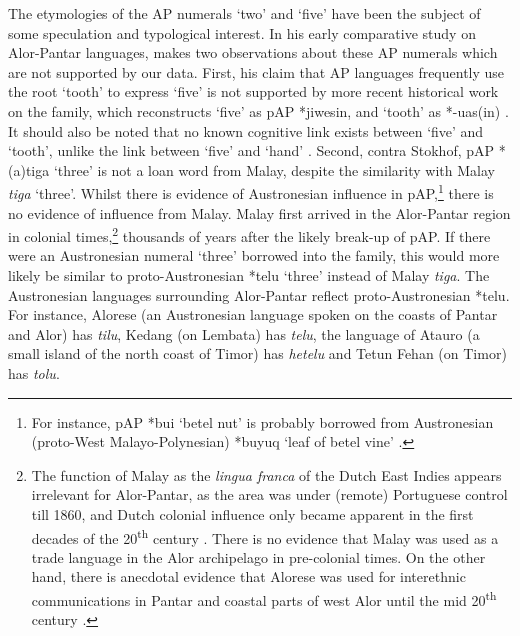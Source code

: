The etymologies of the AP numerals `two' and `five' have been the subject of some speculation and typological interest. In his early comparative study on Alor-Pantar languages, \citet[21]{Stokhof1975} makes two observations about these AP numerals which are not supported by our data. First, his claim that AP languages frequently use the root `tooth' to express `five' is not supported by more recent historical work on the family, which reconstructs `five' as pAP *jiwesin, and `tooth' as *-uas(in) \citep{HoltonRobinsonTV}. It should also be noted that no known cognitive link exists between `five' and `tooth', unlike the link between `five' and `hand' \citep{Majewicz1981,Majewicz1984,Heine1997}. Second, contra Stokhof, pAP *(a)tiga `three' is not a loan word from Malay, despite the similarity with Malay \textit{tiga} `three'. Whilst there is evidence of Austronesian influence in pAP,\footnote{For instance, pAP *bui `betel nut' is probably borrowed from Austronesian (proto-West Malayo-Polynesian) *buyuq `leaf of betel vine' \citep{Blustnd}.}   there is no evidence of influence from Malay. Malay first arrived in the Alor-Pantar region in colonial times,\footnote{The function of Malay as the \textit{lingua franca} of the Dutch East Indies appears irrelevant for Alor-Pantar, as the area was under (remote) Portuguese control till 1860, and Dutch colonial influence only became apparent in the first decades of the 20\textsuperscript{th} century \citep[14 and references cited there]{Klamer2010grammar}. There is no evidence that Malay was used as a trade language in the Alor archipelago in pre-colonial times. On the other hand, there is anecdotal evidence that Alorese was used for interethnic communications in Pantar and coastal parts of west Alor until the mid 20\textsuperscript{th} century \citep{Klamer2011}.}  thousands of years after the likely break-up of pAP. If there were an Austronesian numeral `three' borrowed into the family, this would more likely be similar to proto-Austronesian  *telu `three' \citep[268]{Blust2009} instead of Malay \textit{tiga}. The Austronesian languages surrounding Alor-Pantar reflect proto-Austronesian *telu. For instance, Alorese (an Austronesian language spoken on the coasts of Pantar and Alor) has \textit{tilu}, Kedang (on Lembata) has \textit{telu}, the language of Atauro (a small island of the north coast of Timor) has \textit{hetelu} and Tetun Fehan (on Timor) has \textit{tolu}.

